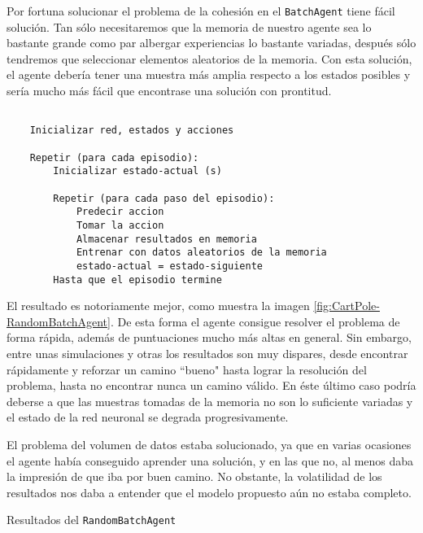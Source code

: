 Por fortuna solucionar el problema de la cohesión en el \texttt{BatchAgent} tiene fácil solución. Tan sólo necesitaremos que la memoria de nuestro agente sea lo bastante grande como par albergar experiencias lo bastante variadas, después sólo tendremos que seleccionar elementos aleatorios de la memoria. Con esta solución, el agente debería tener una muestra más amplia respecto a los estados posibles y sería mucho más fácil que encontrase una solución con prontitud.

\begin{minipage}{0.9\linewidth}%
    \begin{lstlisting}[frame=tb, caption=Pseudocódigo RandomBatchAgent, inputencoding=latin1, label=code:cartpole_drl3]
    
    Inicializar red, estados y acciones
    
    Repetir (para cada episodio):
        Inicializar estado-actual (s)
        
        Repetir (para cada paso del episodio):
            Predecir accion
            Tomar la accion
            Almacenar resultados en memoria
            Entrenar con datos aleatorios de la memoria
            estado-actual = estado-siguiente
        Hasta que el episodio termine
    \end{lstlisting}%
\end{minipage}

El resultado es notoriamente mejor, como muestra la imagen \ref{fig:CartPole-RandomBatchAgent}. De esta forma el agente consigue resolver el problema de forma rápida, además de puntuaciones mucho más altas en general. Sin embargo, entre unas simulaciones y otras los resultados son muy dispares, desde encontrar rápidamente y reforzar un camino ``bueno" hasta lograr la resolución del problema, hasta no encontrar nunca un camino válido. En éste último caso podría deberse a que las muestras tomadas de la memoria no son lo suficiente variadas y el estado de la red neuronal se degrada progresivamente.

El problema del volumen de datos estaba solucionado, ya que en varias ocasiones el agente había conseguido aprender una solución, y en las que no, al menos daba la impresión de que iba por buen camino. No obstante, la volatilidad de los resultados nos daba a entender que el modelo propuesto aún no estaba completo.

%
       {Resultados del \texttt{RandomBatchAgent}}


